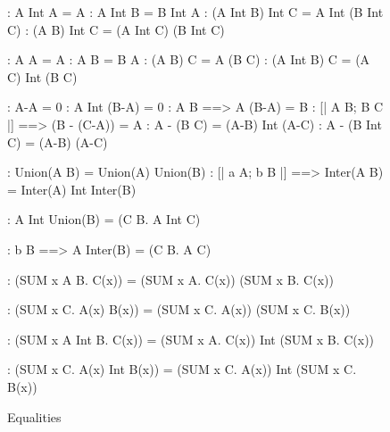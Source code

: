 \begin{figure}
\begin{alltt*}\isastyleminor
{}:        A Int A = A
:       A Int B = B Int A
:         (A Int B) Int C  =  A Int (B Int C)
:    (A \isasymunion B) Int C  =  (A Int C) \isasymunion (B Int C)

:         A \isasymunion A = A
:        A \isasymunion B = B \isasymunion A
:          (A \isasymunion B) \isasymunion C  =  A \isasymunion (B \isasymunion C)
:    (A Int B) \isasymunion C  =  (A \isasymunion C) Int (B \isasymunion C)

:       A-A = 0
:     A Int (B-A) = 0
:    A \isasymsubseteq B ==> A \isasymunion (B-A) = B
: [| A \isasymsubseteq B; B \isasymsubseteq C |] ==> (B - (C-A)) = A
:           A - (B \isasymunion C) = (A-B) Int (A-C)
:          A - (B Int C) = (A-B) \isasymunion (A-C)

:  Union(A \isasymunion B) = Union(A) \isasymunion Union(B)
:  [| a \isasymin A;  b \isasymin B |] ==> 
                   Inter(A \isasymunion B) = Inter(A) Int Inter(B)

:  A Int Union(B) = ({\isasymUnion}C \isasymin B. A Int C)

:   b \isasymin B ==> 
                   A \isasymunion Inter(B) = ({\isasymInter}C \isasymin B. A \isasymunion C)

:   (SUM x \isasymin A \isasymunion B. C(x)) = 
                   (SUM x \isasymin A. C(x)) \isasymunion (SUM x \isasymin B. C(x))

:   (SUM x \isasymin C. A(x) \isasymunion B(x)) =
                   (SUM x \isasymin C. A(x)) \isasymunion (SUM x \isasymin C. B(x))

:  (SUM x \isasymin A Int B. C(x)) =
                   (SUM x \isasymin A. C(x)) Int (SUM x \isasymin B. C(x))

:  (SUM x \isasymin C. A(x) Int B(x)) =
                   (SUM x \isasymin C. A(x)) Int (SUM x \isasymin C. B(x))
\end{alltt*}
\caption{Equalities} \label{zf-equalities}
\end{figure}


